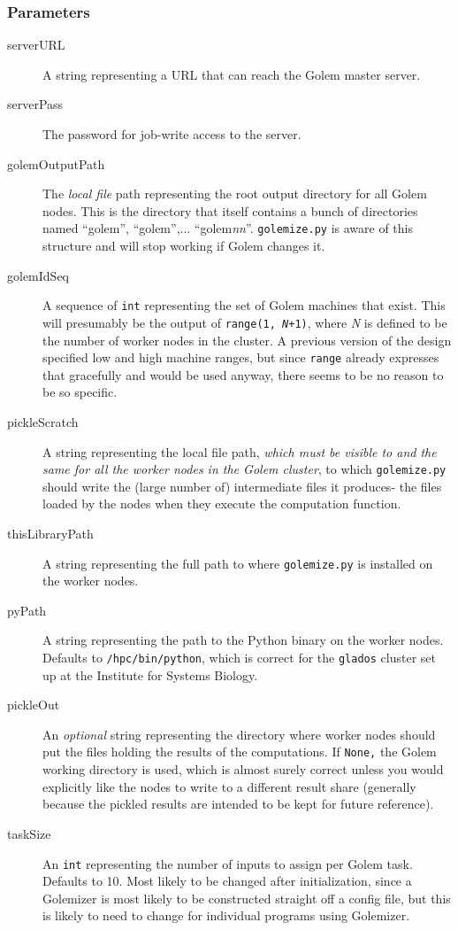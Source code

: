 \documentclass[11pt,ebook,oneside,final]{memoir} %
\begin{document}
\subsubsection{Parameters}
\begin{description}
	\item[serverURL] A string representing a URL that can reach the Golem master server.
	\item[serverPass] The password for job-write access to the server.
	\item[golemOutputPath] The \emph{local file} path representing the root output directory for all Golem nodes. This is the directory that itself contains a bunch of directories named ``golem'', ``golem'',... ``golem\textunderscore\textit{nn}''. \texttt{golemize.py} is aware of this structure and will stop working if Golem changes it.
	\item[golemIdSeq] A sequence of \texttt{int} representing the set of Golem machines that exist. This will presumably be the output of \texttt{range(1, \textit{N}+1)}, where \textit{N} is defined to be the number of worker nodes in the cluster. A previous version of the design specified low and high machine ranges, but since \texttt{range} already expresses that gracefully and would be used anyway, there seems to be no reason to be so specific.
	\item[pickleScratch] A string representing the local file path, \emph{which must be visible to and the same for all the worker nodes in the Golem cluster}, to which \texttt{golemize.py} should write the (large number of) intermediate files it produces- the files loaded by the nodes when they execute the computation function.
	\item[thisLibraryPath] A string representing the full path to where \texttt{golemize.py} is installed on the worker nodes.
	\item[pyPath] A string representing the path to the Python binary on the worker nodes. Defaults to \texttt{/hpc/bin/python}, which is correct for the \texttt{glados} cluster set up at the Institute for Systems Biology.
	\item[pickleOut] An \emph{optional} string representing the directory where worker nodes should put the files holding the results of the computations. If \texttt{None}\texttt, the Golem working directory is used, which is almost surely correct unless you would explicitly like the nodes to write to a different result share (generally because the pickled results are intended to be kept for future reference).
	\item[taskSize] An \texttt{int} representing the number of inputs to assign per Golem task. Defaults to 10. Most likely to be changed after initialization, since a Golemizer is most likely to be constructed straight off a config file, but this is likely to need to change for individual programs using Golemizer.
\end{description}
\end{document}
